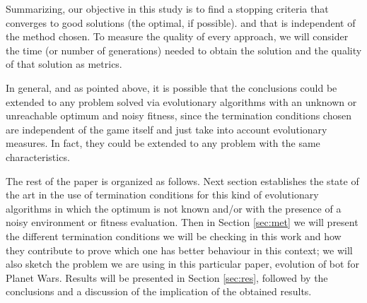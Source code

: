 \documentclass[runningheads,a4paper]{llncs}
\begin{document}
Summarizing, our objective in this study is to find a stopping criteria that converges to good solutions (the optimal, if possible). %
and that is independent of the method chosen. To measure the quality of every approach, we will 
consider the time (or number of generations) needed to obtain the
solution and the quality of that solution as metrics. 

In general, and as pointed above, it is possible that the conclusions
could be extended to any problem solved via evolutionary algorithms
with an unknown or unreachable optimum and noisy fitness, since the
termination conditions chosen are independent of the game itself and
just take into account evolutionary measures. In fact, they could be
extended to any problem with the same characteristics.

The rest of the paper is organized as follows. Next section
establishes the state of the art in the use of termination conditions
for this kind of evolutionary algorithms in which the optimum is not
known and/or with the presence of a noisy environment or fitness evaluation. Then in Section \ref{sec:met} we will %
present the different termination
conditions %
we will be checking in this work and how they contribute to
prove which one has better behaviour in this context; we will also
sketch the problem we are using in this particular paper, evolution of
bot for Planet Wars. Results will be presented in Section
\ref{sec:res}, followed by the conclusions and a discussion of the
implication of the obtained results.
\end{document}
